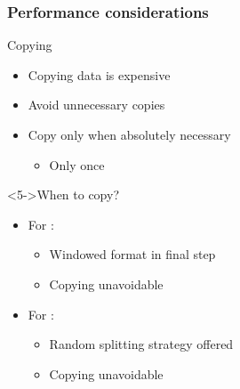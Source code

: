 \documentclass[t,english]{beamer}
\begin{document}

\begin{frame}
  \frametitle{Performance considerations}

  \begin{block}{Copying}
    \begin{itemize}
      \item <1-> Copying data is expensive
      \item <2-> Avoid unnecessary copies
      \item <3-> Copy only when absolutely necessary
            \begin{itemize}
              \item <4-> Only once
            \end{itemize}
    \end{itemize}
  \end{block}

  \begin{block}<5->{When to copy?}
    \begin{itemize}
      \item<6-> For \forecastingDataSet:
            \begin{itemize}
              \item<7-> Windowed format in final step
              \item<8-> Copying unavoidable
            \end{itemize}
      \item<9-> For \classificationDataSet:
            \begin{itemize}
              \item<10-> Random splitting strategy offered
              \item<11-> Copying unavoidable
            \end{itemize}
    \end{itemize}

  \end{block}
\end{frame}
\end{document}
